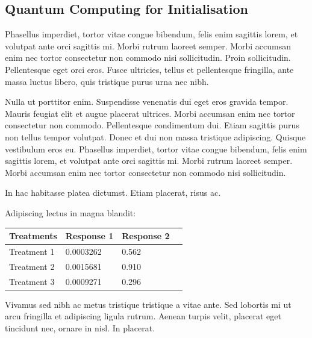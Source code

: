 \documentclass[a0,portrait]{a0poster}
\begin{document}
\begin{multicols}{2}
\section*{Quantum Computing for Initialisation}%
Phasellus imperdiet, tortor vitae congue bibendum, felis enim sagittis lorem, et volutpat ante orci sagittis mi. Morbi rutrum laoreet semper. Morbi accumsan enim nec tortor consectetur non commodo nisi sollicitudin. Proin sollicitudin. Pellentesque eget orci eros. Fusce ultricies, tellus et pellentesque fringilla, ante massa luctus libero, quis tristique purus urna nec nibh.

Nulla ut porttitor enim. Suspendisse venenatis dui eget eros gravida tempor. Mauris feugiat elit et augue placerat ultrices. Morbi accumsan enim nec tortor consectetur non commodo. Pellentesque condimentum dui. Etiam sagittis purus non tellus tempor volutpat. Donec et dui non massa tristique adipiscing. Quisque vestibulum eros eu. Phasellus imperdiet, tortor vitae congue bibendum, felis enim sagittis lorem, et volutpat ante orci sagittis mi. Morbi rutrum laoreet semper. Morbi accumsan enim nec tortor consectetur non commodo nisi sollicitudin.



In hac habitasse platea dictumst. Etiam placerat, risus ac.

Adipiscing lectus in magna blandit:

\begin{center}\vspace{1cm}
\begin{tabular}{l l l l}
\toprule
\textbf{Treatments} & \textbf{Response 1} & \textbf{Response 2} \\
\midrule
Treatment 1 & 0.0003262 & 0.562 \\
Treatment 2 & 0.0015681 & 0.910 \\
Treatment 3 & 0.0009271 & 0.296 \\
\bottomrule
\end{tabular}
\end{center}\vspace{1cm}

Vivamus sed nibh ac metus tristique tristique a vitae ante. Sed lobortis mi ut arcu fringilla et adipiscing ligula rutrum. Aenean turpis velit, placerat eget tincidunt nec, ornare in nisl. In placerat.


\end{multicols}
\end{document}
